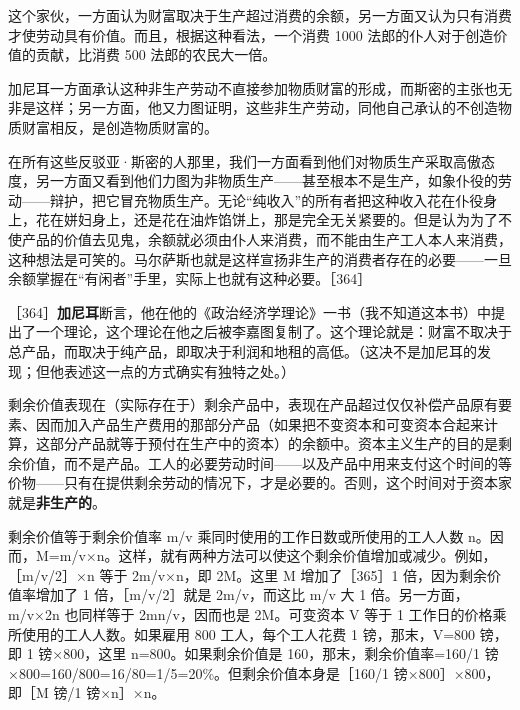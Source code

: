 这个家伙，一方面认为财富取决于生产超过消费的余额，另一方面又认为只有消费才使劳动具有价值。而且，根据这种看法，一个消费 1000 法郎的仆人对于创造价值的贡献，比消费 500 法郎的农民大一倍。

加尼耳一方面承认这种非生产劳动不直接参加物质财富的形成，而斯密的主张也无非是这样；另一方面，他又力图证明，这些非生产劳动，同他自己承认的不创造物质财富相反，是创造物质财富的。

在所有这些反驳亚·斯密的人那里，我们一方面看到他们对物质生产采取高傲态度，另一方面又看到他们力图为非物质生产——甚至根本不是生产，如象仆役的劳动——辩护，把它冒充物质生产。无论“纯收入”的所有者把这种收入花在仆役身上，花在姘妇身上，还是花在油炸馅饼上，那是完全无关紧要的。但是认为为了不使产品的价值去见鬼，余额就必须由仆人来消费，而不能由生产工人本人来消费，这种想法是可笑的。马尔萨斯也就是这样宣扬非生产的消费者存在的必要——一旦余额掌握在“有闲者”手里，实际上也就有这种必要。［364］


［364］\textbf{加尼耳}断言，他在他的《政治经济学理论》一书（我不知道这本书）中提出了一个理论，这个理论在他之后被李嘉图复制了。这个理论就是：财富不取决于总产品，而取决于纯产品，即取决于利润和地租的高低。（这决不是加尼耳的发现；但他表述这一点的方式确实有独特之处。）

剩余价值表现在（实际存在于）剩余产品中，表现在产品超过仅仅补偿产品原有要素、因而加入产品生产费用的那部分产品（如果把不变资本和可变资本合起来计算，这部分产品就等于预付在生产中的资本）的余额中。资本主义生产的目的是剩余价值，而不是产品。工人的必要劳动时间——以及产品中用来支付这个时间的等价物——只有在提供剩余劳动的情况下，才是必要的。否则，这个时间对于资本家就是\textbf{非生产的}。

剩余价值等于剩余价值率 m/v 乘同时使用的工作日数或所使用的工人人数 n。因而，M=m/v×n。这样，就有两种方法可以使这个剩余价值增加或减少。例如，［m/v/2］×n 等于 2m/v×n，即 2M。这里 M 增加了［365］1 倍，因为剩余价值率增加了 1 倍，［m/v/2］就是 2m/v，而这比 m/v 大 1 倍。另一方面，m/v×2n 也同样等于 2mn/v，因而也是 2M。可变资本 V 等于 1 工作日的价格乘所使用的工人人数。如果雇用 800 工人，每个工人花费 1 镑，那末，V=800 镑，即 1 镑×800，这里 n=800。如果剩余价值是 160，那末，剩余价值率=160/1 镑×800=160/800=16/80=1/5=20\%。但剩余价值本身是［160/1 镑×800］×800，即［M 镑/1 镑×n］×n。


